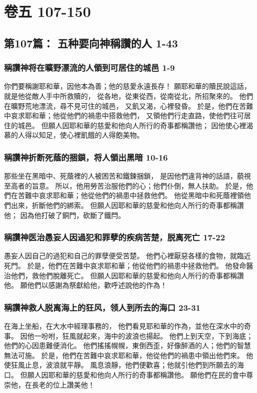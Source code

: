\section{卷五 107-150}

\subsection{第107篇： 五种要向神稱讚的人 1-43}
\subsubsection{稱讚神将在曠野漂流的人領到可居住的城邑 1-9}
你們要稱謝耶和華，因他本為善；他的慈愛永遠長存！
願耶和華的贖民說這話，就是他從敵人手中所救贖的，
從各地，從東從西，從南從北，所招聚來的。
他們在曠野荒地漂流，尋不見可住的城邑，
又飢又渴，心裡發昏。
於是，他們在苦難中哀求耶和華；他從他們的禍患中搭救他們，
又領他們行走直路，使他們往可居住的城邑。
但願人因耶和華的慈愛和他向人所行的奇事都稱讚他；
因他使心裡渴慕的人得以知足，使心裡飢餓的人得飽美物。

\subsubsection{稱讚神折断死蔭的捆鎖，将人領出黑暗 10-16}
那些坐在黑暗中、死蔭裡的人被困苦和鐵鍊捆鎖，
是因他們違背神的話語，藐視至高者的旨意。
所以，他用勞苦治服他們的心；他們仆倒，無人扶助。
於是，他們在苦難中哀求耶和華；他從他們的禍患中拯救他們。
他從黑暗中和死蔭裡領他們出來，折斷他們的綁索。
但願人因耶和華的慈愛和他向人所行的奇事都稱讚他；
因為他打破了銅門，砍斷了鐵閂。

\subsubsection{稱讚神医治愚妄人因過犯和罪孽的疾病苦楚，脱离死亡 17-22}
愚妄人因自己的過犯和自己的罪孽便受苦楚。
他們心裡厭惡各樣的食物，就臨近死門。
於是，他們在苦難中哀求耶和華；他從他們的禍患中拯救他們。
他發命醫治他們，救他們脫離死亡。
但願人因耶和華的慈愛和他向人所行的奇事都稱讚他。
願他們以感謝為祭獻給他，歡呼述說他的作為！

\subsubsection{稱讚神救人脱离海上的狂风，领人到所去的海口 23-31}
在海上坐船，在大水中經理事務的，
他們看見耶和華的作為，並他在深水中的奇事。
因他一吩咐，狂風就起來，海中的波浪也揚起。
他們上到天空，下到海底；他們的心因患難便消化。
他們搖搖幌幌，東倒西歪，好像醉酒的人；他們的智慧無法可施。
於是，他們在苦難中哀求耶和華，他從他們的禍患中領出他們來。
他使狂風止息，波浪就平靜。
風息浪靜，他們便歡喜；他就引他們到所願去的海口。
但願人因耶和華的慈愛和他向人所行的奇事都稱讚他。
願他們在民的會中尊崇他，在長老的位上讚美他！

